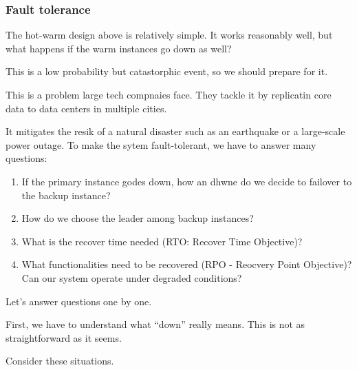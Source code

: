 \documentclass{report}
\theoremstyle{definition}
\let\oldsubsubsection\subsubsection
\renewcommand{\subsubsection}{\oldsubsubsection*}
\begin{document}
\subsubsection{Fault tolerance}

The hot-warm design above is relatively simple. It works reasonably well, but what happens if the warm instances go down as well?

This is a low probability but catastorphic event, so we should prepare for it.

This is a problem large tech compnaies face. They tackle it by replicatin core data to data centers in multiple cities.

It mitigates the resik of a natural disaster such as an earthquake or a large-scale power outage. To make the sytem fault-tolerant, we have to answer many questions:

\begin{enumerate}
\item
If the primary instance godes down, how an dhwne do we decide to failover to the backup instance?
\item
How do we choose the leader among backup instances?
\item
What is the recover time needed (RTO: Recover Time Objective)?
\item
What functionalities need to be recovered (RPO - Reocvery Point Objective)? Can our system operate under degraded conditions?
\end{enumerate}

Let's answer questions one by one.

First, we have to understand what ``down'' really means. This is not as straightforward as it seems.

Consider these situations.
\end{document}
